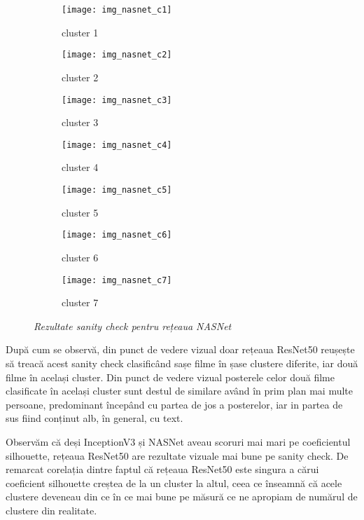 \begin{figure}[!h]
  \centering
  \begin{subfigure}[t]{0.45\textwidth}
    \caption{cluster 1}
    \texttt{[image: img\_nasnet\_c1]}
  \end{subfigure}
  \hfill
  \begin{subfigure}[t]{0.45\textwidth}
    \caption{cluster 2}
    \texttt{[image: img\_nasnet\_c2]}
  \end{subfigure}
   \hfill
  \begin{subfigure}[t]{0.45\textwidth}
    \caption{cluster 3}
    \texttt{[image: img\_nasnet\_c3]}
  \end{subfigure}
  \hfill
  \begin{subfigure}[t]{0.45\textwidth}
    \caption{cluster 4}
    \texttt{[image: img\_nasnet\_c4]}
  \end{subfigure}
  \hfill
  \begin{subfigure}[t]{0.45\textwidth}
    \caption{cluster 5}
    \texttt{[image: img\_nasnet\_c5]}
  \end{subfigure}
  \hfill
  \begin{subfigure}[t]{0.45\textwidth}
    \caption{cluster 6}
    \texttt{[image: img\_nasnet\_c6]}
  \end{subfigure}
    \hfill
  \begin{subfigure}[t]{0.45\textwidth}
    \caption{cluster 7}
    \texttt{[image: img\_nasnet\_c7]}
  \end{subfigure}
  \caption[Rezultate sanity check pentru rețeaua NASNet]{\textit{Rezultate sanity check pentru rețeaua NASNet}}
\end{figure}

După cum se observă, din punct de vedere vizual doar rețeaua ResNet50 reușește să treacă acest sanity check clasificând sașe filme în șase clustere diferite, iar două filme în același cluster. Din punct de vedere vizual posterele celor două filme clasificate în același cluster sunt destul de similare având în prim plan mai multe persoane, predominant începând cu partea de jos a posterelor, iar in partea de sus fiind conținut alb, în general, cu text.

Observăm că deși InceptionV3 și NASNet aveau scoruri mai mari pe coeficientul silhouette, rețeaua ResNet50 are rezultate vizuale mai bune pe sanity check. De remarcat corelația dintre faptul că rețeaua ResNet50 este singura a cărui coeficient silhouette creștea de la un cluster la altul, ceea ce înseamnă că acele clustere deveneau din ce în ce mai bune pe măsură ce ne apropiam de numărul de clustere din realitate.

